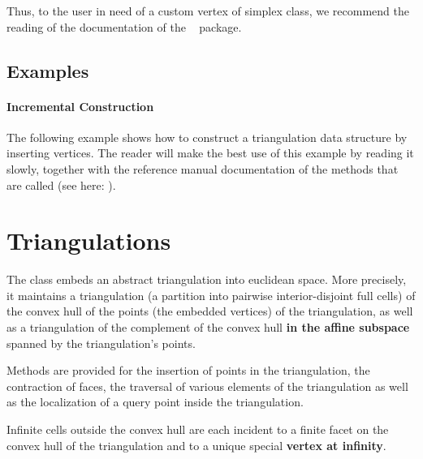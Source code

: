 \begin{ccAdvanced}
Thus, to the user in need of a custom vertex of simplex class, we recommend
the reading of the documentation of the \cgal\  package.
\end{ccAdvanced}


\subsection{Examples\label{triangulation:tds:examples}}
 
\paragraph{Incremental Construction}
The following example shows how to construct a triangulation data structure by
inserting vertices. The reader will make the best use of this example by
reading it slowly, together with the reference manual documentation of the
methods that are called (see here: ).




\section{Triangulations}

The class  embeds an abstract 
triangulation into euclidean space. More precisely, it
maintains a triangulation (a partition into pairwise interior-disjoint full
cells) of the convex hull of the points (the embedded vertices) of the
triangulation, as well as a triangulation of the complement of the convex hull
\textbf{in the affine subspace} spanned by the triangulation's points.

Methods are provided for the insertion of points in the triangulation, the
contraction of faces, the traversal of various elements of the triangulation
as well as the localization of a query point inside the triangulation.

Infinite cells outside the convex hull are each incident to
a finite facet on the convex hull of the triangulation and to a unique special
\textbf{vertex at infinity}. 

